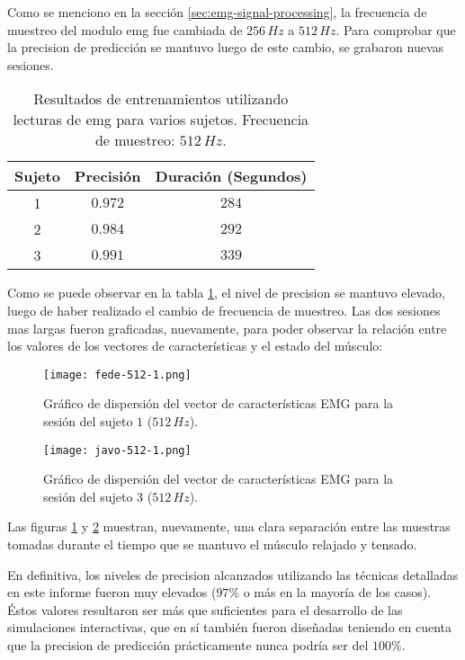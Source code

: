 Como se menciono en la sección \ref{sec:emg-signal-processing}, la frecuencia de muestreo del modulo \acrshort{emg} fue cambiada de $256\,Hz$ a $512\,Hz$. Para comprobar que la precision de predicción se mantuvo luego de este cambio, se grabaron nuevas sesiones.

\begin{table}[H]
\centering
\begin{tabular}{ |c|c|c| } 
 \hline
 Sujeto & Precisión & Duración (Segundos) \\ 
 \hline
 1 & $0.972$ & $284$ \\
 \hline
 2 & $0.984$ & $292$ \\
 \hline
 3 & $0.991$ & $339$ \\

 \hline
\end{tabular}
\caption{Resultados de entrenamientos utilizando lecturas de \acrshort{emg} para varios sujetos. Frecuencia de muestreo: $512\,Hz$.}
\label{tab:emg-results-512}
\end{table}

Como se puede observar en la tabla \ref{tab:emg-results-512}, el nivel de precision se mantuvo elevado, luego de haber realizado el cambio de frecuencia de muestreo. Las dos sesiones mas largas fueron graficadas, nuevamente, para poder observar la relación entre los valores de los vectores de características y el estado del músculo:

\begin{figure}[H]
	\centering
    \texttt{[image: fede-512-1.png]}
    \caption{Gráfico de dispersión del vector de características EMG para la sesión del sujeto $1$ ($512\,Hz$).}
	\label{fig:emg-graph-s1-512}
\end{figure}

\begin{figure}[H]
	\centering
    \texttt{[image: javo-512-1.png]}
    \caption{Gráfico de dispersión del vector de características EMG para la sesión del sujeto $3$ ($512\,Hz$).}
	\label{fig:emg-graph-s3-512}
\end{figure}

Las figuras \ref{fig:emg-graph-s1-512} y \ref{fig:emg-graph-s3-512} muestran, nuevamente, una clara separación entre las muestras tomadas durante el tiempo que se mantuvo el músculo relajado y tensado.

En definitiva, los niveles de precision alcanzados utilizando las técnicas detalladas en este informe fueron muy elevados ($97\%$ o más en la mayoría de los casos). Éstos valores resultaron ser más que suficientes para el desarrollo de las simulaciones interactivas, que en sí también fueron diseñadas teniendo en cuenta que la precision de predicción prácticamente nunca podría ser del $100\%$.